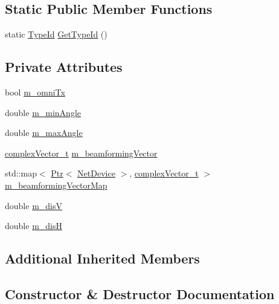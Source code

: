 \subsection*{Static Public Member Functions}
\begin{DoxyCompactItemize}
\item 
static \hyperlink{classns3_1_1TypeId}{Type\+Id} \hyperlink{classns3_1_1AntennaArrayModel_a9798957b0812bffa418eee7b1eefdafe}{Get\+Type\+Id} ()
\end{DoxyCompactItemize}
\subsection*{Private Attributes}
\begin{DoxyCompactItemize}
\item 
bool \hyperlink{classns3_1_1AntennaArrayModel_aba61876be2ce48b14eda6aa791c15c39}{m\+\_\+omni\+Tx}
\item 
double \hyperlink{classns3_1_1AntennaArrayModel_a07697f3127921e2f89bbd4250a9ef731}{m\+\_\+min\+Angle}
\item 
double \hyperlink{classns3_1_1AntennaArrayModel_a26e13d2c83e29ce7d13d6dec94131589}{m\+\_\+max\+Angle}
\item 
\hyperlink{namespacens3_a6a7f75817ae50e6ac47414955b17d926}{complex\+Vector\+\_\+t} \hyperlink{classns3_1_1AntennaArrayModel_a69ed2d2378e42316284e1c19b05ce7fb}{m\+\_\+beamforming\+Vector}
\item 
std\+::map$<$ \hyperlink{classns3_1_1Ptr}{Ptr}$<$ \hyperlink{classns3_1_1NetDevice}{Net\+Device} $>$, \hyperlink{namespacens3_a6a7f75817ae50e6ac47414955b17d926}{complex\+Vector\+\_\+t} $>$ \hyperlink{classns3_1_1AntennaArrayModel_a274f86192c8d405d9f3fa11bcccf380e}{m\+\_\+beamforming\+Vector\+Map}
\item 
double \hyperlink{classns3_1_1AntennaArrayModel_a5836cfea03f4c858239c6b3cb9f1696b}{m\+\_\+disV}
\item 
double \hyperlink{classns3_1_1AntennaArrayModel_a16bbbcc5c7f1ad8cca02eed780c950b5}{m\+\_\+disH}
\end{DoxyCompactItemize}
\subsection*{Additional Inherited Members}


\subsection{Constructor \& Destructor Documentation}

